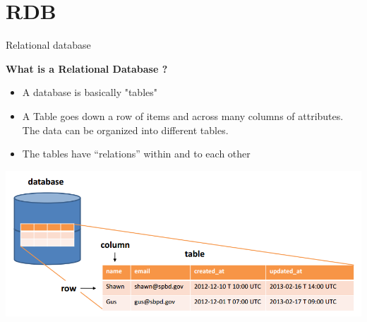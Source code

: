 \documentclass[table]{eecslides}
\begin{document}

\section{RDB}


\begin{frame}{Relational database}

\textbf{What is a Relational Database ?}
		 \begin{itemize}
			 \item A database is basically "tables" 
			\item A Table goes down a row of items and across many columns of attributes. The data can be organized into different tables.
			\item The tables have “relations” within and to each other
		 \end{itemize}

		\vfill

		\begin{center}
		 \includegraphics[width=.8\paperwidth]{relational-databases-for-dummies-fig1.png}
		\end{center}



\end{frame}

\end{document}
